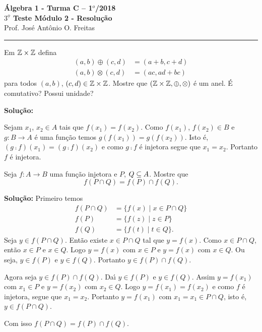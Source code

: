 \documentclass[12pt]{article}
\begin{document}


\begin{center}
{\Large\bf {\'A}lgebra 1 - Turma C -- 1$^{o}$/2018} \\ \vspace{9pt} {\large\bf
  $3^{\underline{o}}$ Teste M\'odulo 2 - Resolu\c{c}\~ao}\\
\vspace{9pt} Prof. Jos{\'e} Ant{\^o}nio O. Freitas
\end{center}
\hrule

\vspace{.6cm}

\questao Em $\mathbb{Z} \times \mathbb{Z}$ defina
\begin{align*}
	(a, b) \oplus (c,d) &= (a + b, c + d)\\
	(a, b) \otimes (c, d) &= (ac, ad + bc)
\end{align*}
para todos $(a, b)$, $(c, d) \in \mathbb{Z} \times \mathbb{Z}$. Mostre que $(\mathbb{Z} \times \mathbb{Z}, \oplus, \otimes)$ é um anel. É comutativo? Possui unidade?

\noindent\textbf{Solu\c{c}\~ao:}

	Sejam $x_1$, $x_2 \in A$ tais que $f(x_1) = f(x_2)$. Como $f(x_1)$, $f(x_2) \in B$ e $g : B \to A$ \'e uma fun\c{c}\~ao temos $g(f(x_1)) = g(f(x_2))$. Isto \'e, $(g \comp f)(x_1) = (g \comp f)(x_2)$ e como $g \comp f$ \'e injetora segue que $x_1 = x_2$. Portanto $f$ \'e injetora.

\vspace{.5cm}

\questao Seja $f : A \to B$ uma fun\c{c}\~ao injetora e $P$, $Q \subseteq A$. Mostre que
\[
	f(P \cap Q) = f(P) \cap f(Q).
\]

\noindent\textbf{Solu\c{c}\~ao:} Primeiro temos
\begin{align*}
	f(P \cap Q) &= \{f(x) \mid x \in P \cap Q\}\\
	f(P) &= \{f(z) \mid z \in P\}\\
	f(Q) &= \{f(t) \mid t \in Q\}.
\end{align*}
Seja $y \in f(P \cap Q)$. Ent\~ao existe $x \in P \cap Q$ tal que $y = f(x)$. Como $x \in P \cap Q$, ent\~ao $x \in P$ e $x \in Q$. Logo $y = f(x)$ com $x \in P$ e $y = f(x)$ com $x \in Q$. Ou seja, $y \in f(P)$ e $y \in f(Q)$. Portanto $y \in f(P) \cap f(Q)$.

Agora seja $y \in f(P) \cap f(Q)$. Da{\'\i} $y \in f(P)$ e $y \in f(Q)$. Assim $y = f(x_1)$ com $x_1 \in P$ e $y = f(x_2)$ com $x_2 \in Q$. Logo $y = f(x_1) = f(x_2)$ e como $f$ \'e injetora, segue que $x_1 = x_2$. Portanto $y = f(x_1)$ com $x_1 = x_1 \in P \cap Q$, isto \'e, $y \in f(P \cap Q)$.

Com isso $f(P \cap Q) = f(P) \cap f(Q)$.
\end{document}
